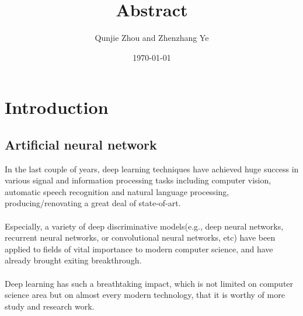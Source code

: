 \documentclass[11pt]{report}
\title{Abstract}
\author{Qunjie Zhou and Zhenzhang Ye}
\date{\today}
\begin{document}
\maketitle
\newpage

\section*{Introduction}
\subsection*{Artificial neural network}
In the last couple of years, deep learning techniques have achieved huge success in various signal and information processing tasks including computer vision, automatic speech recognition and natural language processing, producing/renovating a great deal of state-of-art. \\
\\
Especially, a variety of deep discriminative models(e.g.,  deep neural networks, recurrent neural networks, or convolutional neural networks, etc) have been applied to fields of vital importance to modern computer science, and have already brought exiting breakthrough.\\ 
\\
Deep learning has such a breathtaking impact, which is not limited on computer science area but on almost every modern technology, that it is worthy of more study and research work.
\end{document}
